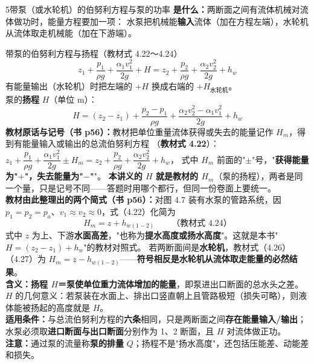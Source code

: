 \begin{kaodian}{5}{带泵（或水轮机）的伯努利方程与泵的功率}
\textbf{是什么：}两断面之间有流体机械对流体做功时，能量方程要加一项：
水泵把机械能\textbf{输入}流体（加在方程左端），水轮机从流体取走机械能（加在下游端）。

\begin{gongshi}{带泵的伯努利方程与扬程（教材式 4.22～4.24）}
\[ z_1+\frac{p_1}{\rho g}+\frac{\alpha_1 v_1^2}{2g}+H=z_2+\frac{p_2}{\rho g}+\frac{\alpha_2 v_2^2}{2g}+h_w \]
有能量输出（水轮机）时把左端的 $+H$ 换成右端的 $+H_{\text{水轮机}}$。\\
泵的\textbf{扬程} $H$（单位 m）：
\[ H=(z_2-z_1)+\frac{p_2-p_1}{\rho g}+\frac{\alpha_2 v_2^2-\alpha_1 v_1^2}{2g}+h_w \]
\textbf{教材原话与记号（书 p56）：}教材把单位重量流体获得或失去的能量记作 $H_m$，得到有能量输入或输出的总流伯努利方程
（\textbf{教材式 4.22}）：$z_1+\dfrac{p_1}{\rho g}+\dfrac{\alpha_1 v_1^2}{2g}\pm H_m=z_2+\dfrac{p_2}{\rho g}+\dfrac{\alpha_2 v_2^2}{2g}+h_w$，
式中 $H_m$ 前面的"$\pm$"号，"\textbf{获得能量为"$+$"，失去能量为"$-$"}"。
\textbf{本讲义的 $H$ 就是教材的 $H_m$}（泵的扬程），两者是同一个量，只是记号不同——答题时用哪个都行，但同一份卷面上要统一。\\
\textbf{教材由此整理出的两个简式（书 p56）：}对图 4.7 装有水泵的管路系统，因 $p_1=p_2=p_a$、$v_1\approx v_2\approx0$，式（4.22）化简为
\[ H_m=z+h_{w(1-2)}\qquad\text{（教材式 4.24）} \]
式中 $z$ 为上、下游\textbf{水面高差}，"也称为\textbf{提水高度或扬水高度}"。这就是本书"$H=(z_2-z_1)+h_w$"的教材对照式。
若两断面间是\textbf{水轮机}，教材式（4.26）（4.27）为 $H_m=z-h_{w(1-2)}$——\textbf{符号相反是水轮机从流体取走能量的必然结果}。\\
\textbf{含义：}\textbf{扬程 $H$＝泵使单位重力流体增加的能量}，即泵进出口断面的总水头之差。
$H$ 的几何意义：若泵装在水面上、排出口竖直朝上且管路极短（损失可略），则液体能被扬起的高度就是 $H$。\\
\textbf{适用条件：}与总流伯努利方程的\textbf{六条}相同，只是两断面之间\textbf{存在能量输入/输出}；
水泵必须取\textbf{进口断面与出口断面}分别作为 1、2 断面，且 $H$ 对流体做正功。\\
\textbf{注意：}通过泵的流量称\textbf{泵的排量} $Q$；扬程不是"扬水高度"，还包括压能差、动能差和损失。
\end{gongshi}


\end{kaodian}
